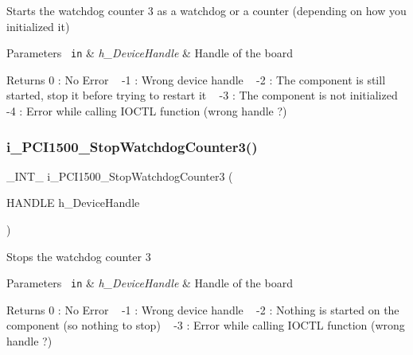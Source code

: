 Starts the watchdog counter 3 as a watchdog or a counter (depending on how you initialized it)


\begin{DoxyParams}[1]{Parameters}
\mbox{\texttt{ in}}  & {\em h\+\_\+\+Device\+Handle} & Handle of the board\\
\hline
\end{DoxyParams}
\begin{DoxyReturn}{Returns}
0 \+: No Error ~\newline
 -\/1 \+: Wrong device handle ~\newline
 -\/2 \+: The component is still started, stop it before trying to restart it ~\newline
 -\/3 \+: The component is not initialized ~\newline
 -\/4 \+: Error while calling I\+O\+C\+TL function (wrong handle ?) ~\newline

\end{DoxyReturn}
\mbox{\label{group___timer3_ga7731551ca4d73cf6e7ecce79bf2290f7}} 
\subsubsection{\texorpdfstring{i\_PCI1500\_StopWatchdogCounter3()}{i\_PCI1500\_StopWatchdogCounter3()}}
{\footnotesize\ttfamily \+\_\+\+I\+N\+T\+\_\+ i\+\_\+\+P\+C\+I1500\+\_\+\+Stop\+Watchdog\+Counter3 (\begin{DoxyParamCaption}\item[{H\+A\+N\+D\+LE}]{h\+\_\+\+Device\+Handle }\end{DoxyParamCaption})}

Stops the watchdog counter 3


\begin{DoxyParams}[1]{Parameters}
\mbox{\texttt{ in}}  & {\em h\+\_\+\+Device\+Handle} & Handle of the board\\
\hline
\end{DoxyParams}
\begin{DoxyReturn}{Returns}
0 \+: No Error ~\newline
 -\/1 \+: Wrong device handle ~\newline
 -\/2 \+: Nothing is started on the component (so nothing to stop) ~\newline
 -\/3 \+: Error while calling I\+O\+C\+TL function (wrong handle ?) ~\newline

\end{DoxyReturn}
\mbox{\label{group___timer3_ga8a1123a07c58758552e2eacead5f8285}} 
